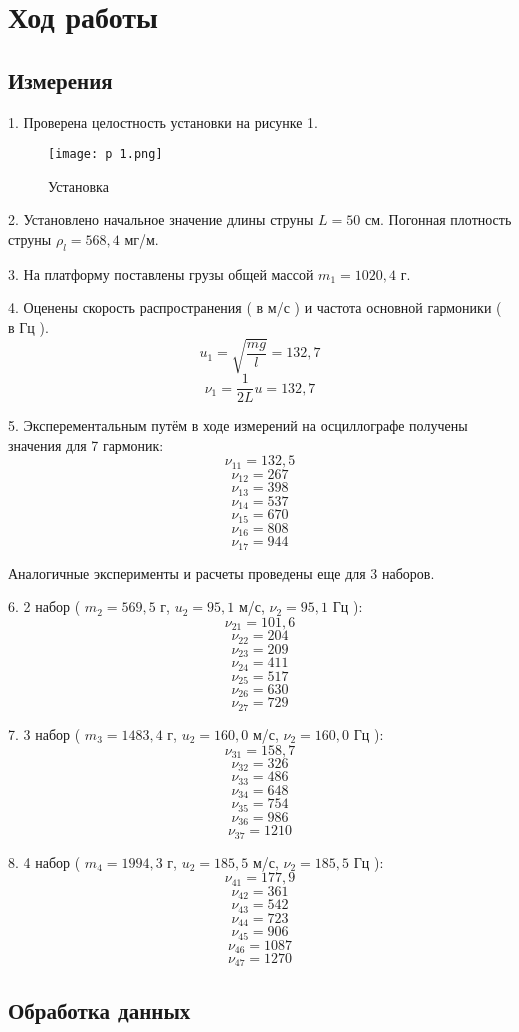 \section{Ход работы}
\subsection{Измерения}

1. Проверена целостность установки на рисунке 1.
\begin{figure}[H]
    \centering
\texttt{[image: p 1.png]}
    \caption{Установка}
    \label{fig:my_label}
\end{figure}

2. Установлено начальное значение длины струны $L = 50$ см. Погонная плотность струны $\rho_l = 568,4$ мг/м.

3. На платформу поставлены грузы общей массой $m_1 = 1020,4$ г.

4. Оценены скорость распространения ( в м/с ) и частота основной гармоники ( в Гц ).
\[u_1 = \sqrt{\frac{mg}{l}} = 132,7\]
\[\nu_1 = \frac{1}{2L}u = 132,7\]

5. Эксперементальным путём в ходе измерений на осциллографе получены значения для 7 гармоник:
\[\nu_{11} = 132,5\]
\[\nu_{12} = 267\]
\[\nu_{13} = 398\]
\[\nu_{14} = 537\]
\[\nu_{15} = 670\]
\[\nu_{16} = 808\]
\[\nu_{17} = 944\]

Аналогичные эксперименты и расчеты проведены еще для 3 наборов.

6. 2 набор ( $m_2 = 569,5$ г, $u_2 = 95,1$ м/с, $\nu_2 = 95,1$ Гц ):
\[\nu_{21} = 101,6\]
\[\nu_{22} = 204\]
\[\nu_{23} = 209\]
\[\nu_{24} = 411\]
\[\nu_{25} = 517\]
\[\nu_{26} = 630\]
\[\nu_{27} = 729\]

7. 3 набор ( $m_3 = 1483,4$ г, $u_2 = 160,0$ м/с, $\nu_2 = 160,0$ Гц ):
\[\nu_{31} = 158,7\]
\[\nu_{32} = 326\]
\[\nu_{33} = 486\]
\[\nu_{34} = 648\]
\[\nu_{35} = 754\]
\[\nu_{36} = 986\]
\[\nu_{37} = 1210\]

8. 4 набор ( $m_4 = 1994,3$ г, $u_2 = 185,5$ м/с, $\nu_2 = 185,5$ Гц ):
\[\nu_{41} = 177,9\]
\[\nu_{42} = 361\]
\[\nu_{43} = 542\]
\[\nu_{44} = 723\]
\[\nu_{45} = 906\]
\[\nu_{46} = 1087\]
\[\nu_{47} = 1270\]
\subsection{Обработка данных}

